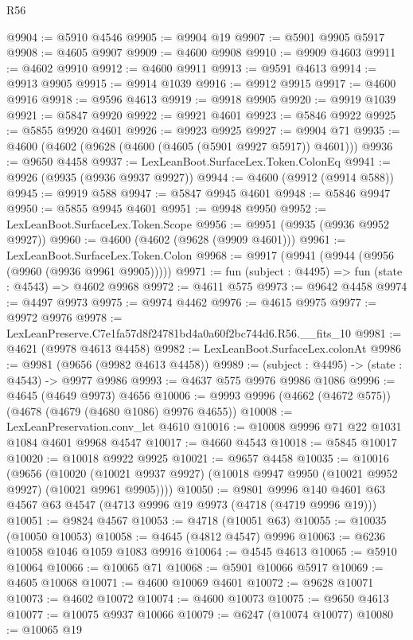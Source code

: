\begin{lexlean}{R56}
\begin{coremodule}
@9904 := @5910 @4546
@9905 := @9904 @19
@9907 := @5901 @9905 @5917
@9908 := @4605 @9907
@9909 := @4600 @9908
@9910 := @9909 @4603
@9911 := @4602 @9910
@9912 := @4600 @9911
@9913 := @9591 @4613
@9914 := @9913 @9905
@9915 := @9914 @1039
@9916 := @9912 @9915
@9917 := @4600 @9916
@9918 := @9596 @4613
@9919 := @9918 @9905
@9920 := @9919 @1039
@9921 := @5847 @9920
@9922 := @9921 @4601
@9923 := @5846 @9922
@9925 := @5855 @9920 @4601
@9926 := @9923 @9925
@9927 := @9904 @71
@9935 := @4600 (@4602 (@9628 (@4600 (@4605 (@5901 @9927 @5917)) @4601)))
@9936 := @9650 @4458
@9937 := LexLeanBoot.SurfaceLex.Token.ColonEq
@9941 := @9926 (@9935 (@9936 @9937 @9927))
@9944 := @4600 (@9912 (@9914 @588))
@9945 := @9919 @588
@9947 := @5847 @9945 @4601
@9948 := @5846 @9947
@9950 := @5855 @9945 @4601
@9951 := @9948 @9950
@9952 := LexLeanBoot.SurfaceLex.Token.Scope
@9956 := @9951 (@9935 (@9936 @9952 @9927))
@9960 := @4600 (@4602 (@9628 (@9909 @4601)))
@9961 := LexLeanBoot.SurfaceLex.Token.Colon
@9968 := @9917 (@9941 (@9944 (@9956 (@9960 (@9936 @9961 @9905)))))
@9971 := fun (subject : @4495) => fun (state : @4543) => @4602 @9968
@9972 := @4611 @575
@9973 := @9642 @4458
@9974 := @4497 @9973
@9975 := @9974 @4462
@9976 := @4615 @9975
@9977 := @9972 @9976
@9978 := LexLeanPreserve.C7e1fa57d8f24781bd4a0a60f2bc744d6.R56.__fits_10
@9981 := @4621 (@9978 @4613 @4458)
@9982 := LexLeanBoot.SurfaceLex.colonAt
@9986 := @9981 (@9656 (@9982 @4613 @4458))
@9989 := (subject : @4495) -> (state : @4543) -> @9977 @9986
@9993 := @4637 @575 @9976 @9986 @1086
@9996 := @4645 (@4649 @9973) @4656
@10006 := @9993 @9996 (@4662 (@4672 @575)) (@4678 (@4679 (@4680 @1086) @9976 @4655))
@10008 := LexLeanPreservation.conv_let @4610
@10016 := @10008 @9996 @71 @22 @1031 @1084 @4601 @9968 @4547
@10017 := @4660 @4543
@10018 := @5845 @10017
@10020 := @10018 @9922 @9925
@10021 := @9657 @4458
@10035 := @10016
    (@9656
      (@10020 (@10021 @9937 @9927) (@10018 @9947 @9950 (@10021 @9952 @9927) (@10021 @9961 @9905))))
@10050 := @9801
    @9996
    @140
    @4601
    @63
    @4567
    @63
    @4547
    (@4713 @9996 @19 @9973 (@4718 (@4719 @9996 @19)))
@10051 := @9824 @4567
@10053 := @4718 (@10051 @63)
@10055 := @10035 (@10050 @10053)
@10058 := @4645 (@4812 @4547) @9996
@10063 := @6236 @10058 @1046 @1059 @1083 @9916
@10064 := @4545 @4613
@10065 := @5910 @10064
@10066 := @10065 @71
@10068 := @5901 @10066 @5917
@10069 := @4605 @10068
@10071 := @4600 @10069 @4601
@10072 := @9628 @10071
@10073 := @4602 @10072
@10074 := @4600 @10073
@10075 := @9650 @4613
@10077 := @10075 @9937 @10066
@10079 := @6247 (@10074 @10077)
@10080 := @10065 @19

\end{coremodule}
\end{lexlean}
